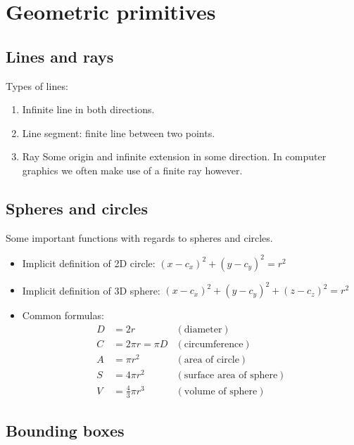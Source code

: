 \section{Geometric primitives}

\subsection{Lines and rays}

Types of lines:
\begin{enumerate}
	\item Infinite line in both directions.
	\item Line segment: finite line between two points.
	\item Ray Some origin and infinite extension in some direction. In computer graphics we often make use of a finite ray however.
\end{enumerate}

\subsection{Spheres and circles}

Some important functions with regards to spheres and circles.

\begin{itemize}
	\item Implicit definition of 2D circle: $(x-c_x)^2 + (y-c_y)^2=r^2$
	\item Implicit definition of 3D sphere: $(x-c_x)^2 + (y-c_y)^2+ (z-c_z)^2=r^2$
	\item Common formulas:
	\begin{align*}
		D &= 2r &(\text{diameter}) \\
		C &= 2\pi{}r = \pi{}D &(\text{circumference}) \\
		A &= \pi{}r^2 &(\text{area of circle}) \\
		S &= 4\pi{}r^2 &(\text{surface area of sphere}) \\
		V &= \frac{4}{3}\pi{}r^3 &(\text{volume of sphere})
	\end{align*}
\end{itemize}

\subsection{Bounding boxes}

